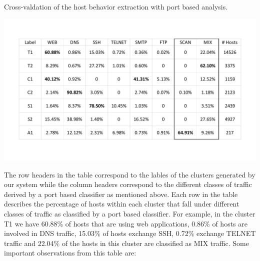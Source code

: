 \begin{table}[b]
	\caption{Cross-valdation of the host behavior extraction with port based analysis.}%
	\centerline{\includegraphics[scale = 0.5]{validation.pdf}}	
\end{table}

The row headers in the table correspond to the lables of the clusters generated by our system while the column headers correspond to the different classes of traffic derived by a port based classifier as mentioned above. Each row in the table describes the percentage of hosts within each cluster that fall under different classes of traffic as classified by a port based classifier. For example, in the cluster T1 we have 60.88\% of hosts that are using web applications, 0.86\% of hosts are involved in DNS traffic, 15.03\% of hosts exchange SSH, 0.72\% exchange TELNET traffic and 22.04\% of the hosts in this cluster are classified as MIX traffic. Some important observations from this table are:

